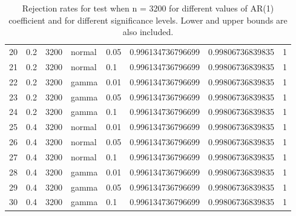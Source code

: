 \begin{table}[ht]
\begin{tabular}{rlllllll}
  20 & 0.2 & 3200 & normal & 0.05 & 0.996134736796699 & 0.99806736839835 & 1 \\ 
  21 & 0.2 & 3200 & normal & 0.1 & 0.996134736796699 & 0.99806736839835 & 1 \\ 
  22 & 0.2 & 3200 & gamma & 0.01 & 0.996134736796699 & 0.99806736839835 & 1 \\ 
  23 & 0.2 & 3200 & gamma & 0.05 & 0.996134736796699 & 0.99806736839835 & 1 \\ 
  24 & 0.2 & 3200 & gamma & 0.1 & 0.996134736796699 & 0.99806736839835 & 1 \\ 
  25 & 0.4 & 3200 & normal & 0.01 & 0.996134736796699 & 0.99806736839835 & 1 \\ 
  26 & 0.4 & 3200 & normal & 0.05 & 0.996134736796699 & 0.99806736839835 & 1 \\ 
  27 & 0.4 & 3200 & normal & 0.1 & 0.996134736796699 & 0.99806736839835 & 1 \\ 
  28 & 0.4 & 3200 & gamma & 0.01 & 0.996134736796699 & 0.99806736839835 & 1 \\ 
  29 & 0.4 & 3200 & gamma & 0.05 & 0.996134736796699 & 0.99806736839835 & 1 \\ 
  30 & 0.4 & 3200 & gamma & 0.1 & 0.996134736796699 & 0.99806736839835 & 1 \\ 
   \hline
\end{tabular}
\caption{Rejection rates for test when n = 3200 for 
                   different values of AR(1) coefficient and for different 
                   significance levels. Lower and upper bounds are also 
                   included.} 
\label{table:rr_3200}
\end{table}

